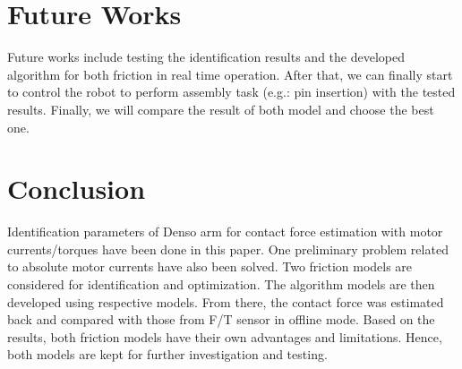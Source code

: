 \documentclass[letterpaper, 10 pt, conference]{ieeeconf}
\begin{document}

      \section{Future Works}
Future works include testing the identification results and the developed algorithm for both friction in real time operation. After that, we can finally start to control the robot to perform assembly task (e.g.: pin insertion) with the tested results. Finally, we will compare the result of both model and choose the best one.


      \section{Conclusion}
Identification parameters of Denso arm for contact force estimation with motor currents/torques have been done in this paper. One preliminary problem related to absolute motor currents have also been solved. Two friction models are considered for identification and optimization. The algorithm models are then developed using respective models. From there, the contact force was estimated back and compared with those from F/T sensor in offline mode. Based on the results, both friction models have their own advantages and limitations. Hence, both models are kept for further investigation and testing. 



\end{document}

